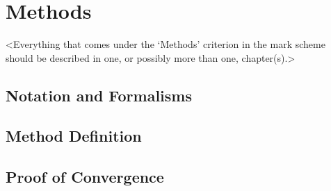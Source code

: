 \chapter{Methods}
\label{chapter2}

<Everything that comes under the `Methods' criterion in the mark scheme should be described in one, or possibly more than one, chapter(s).>

\section{Notation and Formalisms}

\section{Method Definition}

\section{Proof of Convergence}
